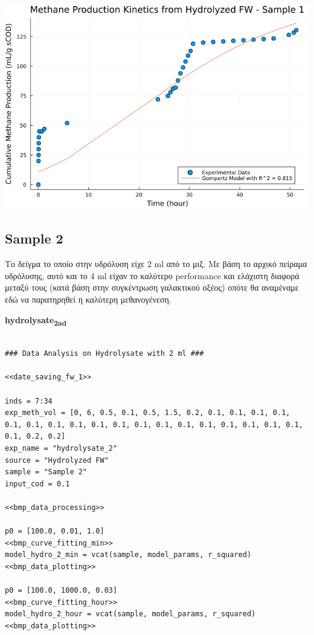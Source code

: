 \documentclass[11pt]{article}
\begin{document}
\begin{center}
\includegraphics[width=.9\linewidth]{../plots/BMPs/Hydrolyzed FW/methane_kinetics_hydrolysate_1_hour.png}
\end{center}

\subsection{Sample 2}
\label{sec:org5a4c8ff}
Το δείγμα το οποίο στην υδρόλυση είχε 2 ml από το μιξ. Με βάση το αρχικό πείραμα υδρόλυσης, αυτό και το 4 ml είχαν το καλύτερο performance και ελάχιστη διαφορά μεταξύ τους (κατά βάση στην συγκέντρωση γαλακτικού οξέος) οπότε θα αναμέναμε εδώ να παρατηρηθεί η καλύτερη μεθανογένεση.

\textbf{hydrolysate\textsubscript{2}\textsubscript{ad}}
\begin{verbatim}

### Data Analysis on Hydrolysate with 2 ml ###

<<date_saving_fw_1>>

inds = 7:34
exp_meth_vol = [0, 6, 0.5, 0.1, 0.5, 1.5, 0.2, 0.1, 0.1, 0.1, 0.1, 0.1, 0.1, 0.1, 0.1, 0.1, 0.1, 0.1, 0.1, 0.1, 0.1, 0.1, 0.1, 0.1, 0.1, 0.1, 0.2, 0.2]
exp_name = "hydrolysate_2"
source = "Hydrolyzed FW"
sample = "Sample 2"
input_cod = 0.1

<<bmp_data_processing>>

p0 = [100.0, 0.01, 1.0]
<<bmp_curve_fitting_min>>
model_hydro_2_min = vcat(sample, model_params, r_squared)
<<bmp_data_plotting>>

p0 = [100.0, 1000.0, 0.03]
<<bmp_curve_fitting_hour>>
model_hydro_2_hour = vcat(sample, model_params, r_squared)
<<bmp_data_plotting>>
\end{verbatim}
\end{document}
